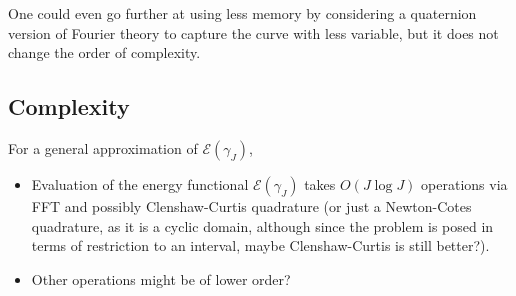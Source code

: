 \documentclass[a4paper]{article}
\begin{document}
One could even go further at using less memory by considering a quaternion version of Fourier theory to capture the curve with less variable, but it does not change the order of complexity.

\subsection{Complexity}
For a general approximation of $\mathcal{E}\left( \gamma_J \right)$,
\begin{itemize}
    \item Evaluation of the energy functional $\mathcal{E} \left( \gamma_J \right)$ takes $O\left( J \log J \right)$ operations via FFT and possibly Clenshaw-Curtis quadrature (or just a Newton-Cotes quadrature, as it is a cyclic domain, although since the problem is posed in terms of restriction to an interval, maybe Clenshaw-Curtis is still better?).
    \item Other operations might be of lower order? 
\end{itemize}
\end{document}
